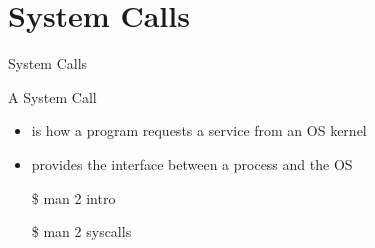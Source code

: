 \section{System Calls}
\label{sec:system-calls}


\begin{frame}{System Calls}
  \begin{block}{A System Call}
    \begin{itemize}
    \item is how a program requests a service from an OS kernel
    \item provides the interface between a process and the OS
    \end{itemize}
  \end{block}
  \ttfamily
  \begin{itemize}
  \item[\$] man 2 intro
  \item[\$] man 2 syscalls
  \end{itemize}
\end{frame}

\begin{frame}%
  \begin{center}
  \end{center}
\end{frame}

\begin{frame}
  \begin{center}
  \end{center}
\end{frame}

\begin{frame}%
  \begin{center}
  \end{center}
\end{frame}



